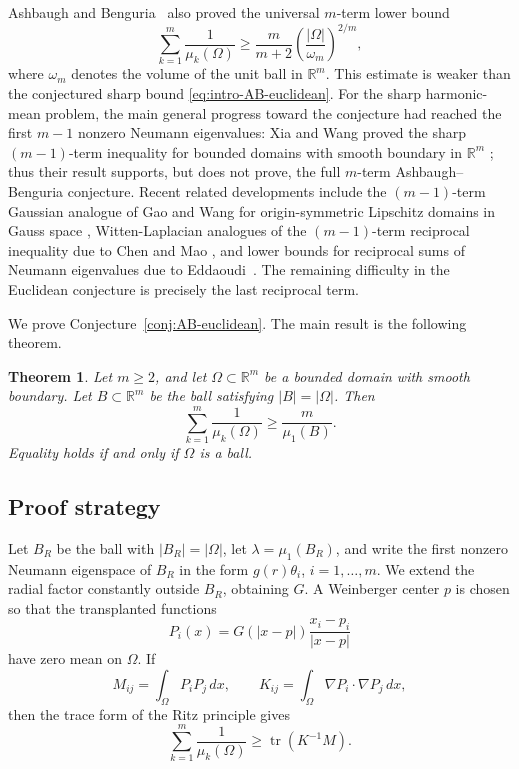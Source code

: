 \documentclass[11pt,letterpaper,reqno]{amsart}
\newtheorem{theorem}{Theorem}[section]
\theoremstyle{definition}
\newcommand{\R}{\mathbb R}
\begin{document}
Ashbaugh and Benguria~\cite{AB93} also proved the universal \(m\)-term lower bound
\[
        \sum_{k=1}^m \frac1{\mu_k(\Omega)}
        \ge
        \frac{m}{m+2}\left(\frac{|\Omega|}{\omega_m}\right)^{2/m},
\]
where \(\omega_m\) denotes the volume of the unit ball in \(\mathbb R^m\).
This estimate is weaker than the conjectured sharp bound
\eqref{eq:intro-AB-euclidean}. For the sharp harmonic-mean problem, the main general progress toward
the conjecture had reached the first \(m-1\) nonzero Neumann eigenvalues:
Xia and Wang proved the sharp \((m-1)\)-term inequality for bounded domains
with smooth boundary in \(\mathbb R^m\) \cite[Theorem~1.1]{XW23}; thus
their result supports, but does not prove, the full \(m\)-term
Ashbaugh--Benguria conjecture. Recent related developments include the
\((m-1)\)-term Gaussian analogue of Gao and Wang for origin-symmetric
Lipschitz domains in Gauss space \cite{GaoWang26}, Witten-Laplacian
analogues of the \((m-1)\)-term reciprocal inequality due to Chen and Mao
\cite{CM24}, and lower bounds for reciprocal sums of Neumann eigenvalues
due to Eddaoudi~\cite{Edd25}. The remaining difficulty in the Euclidean
conjecture is precisely the last reciprocal term.




We prove Conjecture~\ref{conj:AB-euclidean}. The main result is the
following theorem.

\begin{theorem}\label{thm:main-euclidean}
Let \(m\geq2\), and let \(\Omega\subset\R^m\) be a bounded domain with smooth boundary. Let \(B\subset\R^m\) be the ball satisfying \(|B|=|\Omega|\). Then
\[
        \sum_{k=1}^m\frac1{\mu_k(\Omega)}
        \geq
        \frac{m}{\mu_1(B)}.
\]
Equality holds if and only if \(\Omega\) is a ball.
\end{theorem}



\subsection{Proof strategy}
Let \(B_R\) be the ball with \(|B_R|=|\Omega|\), let
\(\lambda=\mu_1(B_R)\), and write the first nonzero Neumann eigenspace
of \(B_R\) in the form \(g(r)\theta_i\), \(i=1,\ldots,m\). We extend the
radial factor constantly outside \(B_R\), obtaining \(G\). A Weinberger
center \(p\) is chosen so that the transplanted functions
\[
        P_i(x)=G(|x-p|)\frac{x_i-p_i}{|x-p|}
\]
have zero mean on \(\Omega\). If
\[
        M_{ij}=\int_\Omega P_iP_j\,dx,
        \qquad
        K_{ij}=\int_\Omega \nabla P_i\cdot\nabla P_j\,dx,
\]
then the trace form of the Ritz principle gives
\[
        \sum_{k=1}^m\frac1{\mu_k(\Omega)}
        \ge \operatorname{tr}(K^{-1}M).
\]
\end{document}
